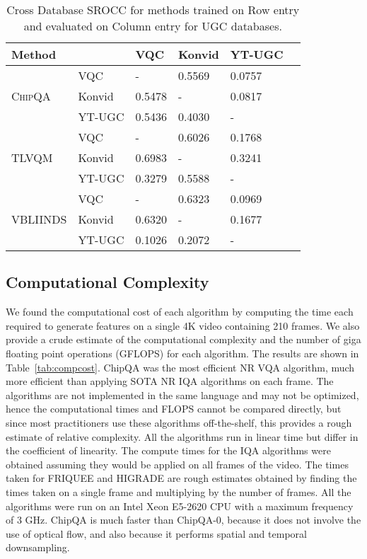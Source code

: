 \documentclass[journal]{IEEEtran}
\begin{document}
\begin{table}
\caption{ Cross Database SROCC for methods trained on Row entry and evaluated on Column entry for UGC databases.} 
\begin{center} 
\begin{tabular}{|l|l|l|l|l|l|}
\hline
 Method & & VQC & Konvid & YT-UGC \\
\hline
\multirow{3}{*}{\textsc{ChipQA}}  & VQC &  - & 0.5569 &  0.0757\\
& Konvid & 0.5478 & - & 0.0817\\
& YT-UGC & 0.5436  & 0.4030 & - \\
\hline
\multirow{3}{*}{\textsc{TLVQM}}  & VQC &  - & 0.6026 & 0.1768 \\
& Konvid & 0.6983 & - & 0.3241 \\
& YT-UGC & 0.3279  & 0.5588 & - \\
\hline
\multirow{3}{*}{\textsc{VBLIINDS}}  & VQC &  - & 0.6323 & 0.0969 \\
& Konvid & 0.6320 & - & 0.1677 \\
& YT-UGC & 0.1026  & 0.2072 & - \\
\hline
\end{tabular}
\label{tab:crossdatabase}
\end{center}
\vspace{-5mm}
\end{table}


\subsection{Computational Complexity}


We found the computational cost of each algorithm by computing the time each required to generate features on a single 4K video containing 210 frames. We also provide a crude estimate of the  computational complexity and the number of giga floating point operations (GFLOPS) for each algorithm. The results are shown in Table~\ref{tab:compcost}. ChipQA was the most efficient NR VQA algorithm, much more efficient than applying SOTA NR IQA algorithms on each frame. The algorithms are not implemented in the same language and may not be optimized, hence the computational times and FLOPS cannot be compared directly, but since most practitioners use these algorithms off-the-shelf, this provides a rough estimate of relative complexity. All the algorithms run in linear time but differ in the coefficient of linearity. The compute times for the IQA algorithms were obtained assuming they would be applied on all frames of the video. The times taken for FRIQUEE and HIGRADE are rough estimates obtained by finding the times taken on a single frame and multiplying by the number of frames. All the algorithms were run on an Intel Xeon E5-2620 CPU with a maximum frequency of 3 GHz. ChipQA is much faster than ChipQA-0, because it does not involve the use of optical flow, and also because it performs spatial and temporal downsampling.
\end{document}
